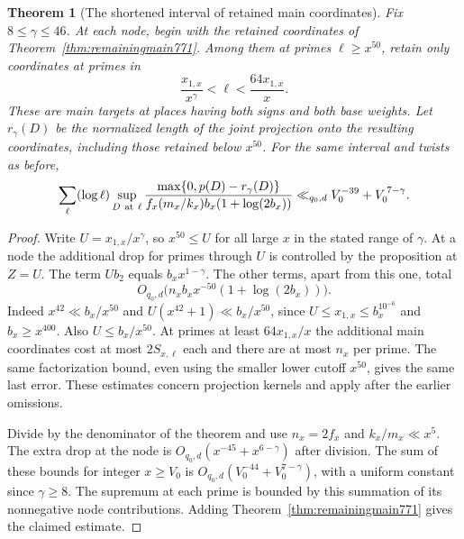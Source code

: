 \documentclass[a4paper,11pt]{article}
\newtheorem{theorem}[proposition]{Theorem}
\theoremstyle{definition}
\theoremstyle{remark}
\numberwithin{equation}{section}
\begin{document}
\begin{theorem}[The shortened interval of retained main coordinates]
\leavevmode\label{thm:middlerange773}
Fix \(8\le\gamma\le46\). At each node, begin with the
retained coordinates of Theorem~\ref{thm:remainingmain771}.
Among them at primes \(\ell\ge x^{50}\), retain only
coordinates at primes in
\[
                 \frac{x_{1,x}}{x^\gamma}<\ell<
                         \frac{64x_{1,x}}{x}.
\]
These are main targets at places having both signs and both
base weights. Let \(r_\gamma(D)\) be the normalized length
of the joint projection onto the resulting coordinates,
including those retained below \(x^{50}\). For the same
interval and twists as before,
\[
 \sum_{\ell}(\log\ell)\sup_{D\ {\rm at}\ \ell}
 \frac{\max\{0,p(D)-r_\gamma(D)\}}
      {f_x(m_x/k_x)b_x(1+\log(2b_x))}
 \ll_{q_0,d} V_0^{-39}+V_0^{\,7-\gamma}.
\]
\end{theorem}
\begin{proof}
Write \(U=x_{1,x}/x^\gamma\), so \(x^{50}\le U\) for all
large \(x\) in the stated range of \(\gamma\).
At a node the additional drop for primes through \(U\)
is controlled by the proposition at \(Z=U\). The
term \(U b_2\) equals \(b_x x^{1-\gamma}\). The other
terms, apart from this one, total
\[
        O_{q_0,d}\big(n_x b_x x^{-50}(1+\log(2b_x))\big).
\]
Indeed \(x^{42}\ll b_x/x^{50}\) and
\(U(x^{42}+1)\ll b_x/x^{50}\), since
\(U\le x_{1,x}\le b_x^{10^{-6}}\) and \(b_x\ge x^{400}\).
Also \(U\le b_x/x^{50}\). At primes at least
\(64x_{1,x}/x\) the additional main coordinates cost
at most \(2S_{x,\ell}\) each and there are at most \(n_x\)
per prime. The same factorization bound, even using the
smaller lower cutoff \(x^{50}\), gives the same last
error. These estimates concern projection kernels and
apply after the earlier omissions.

Divide by the denominator of the theorem and use
\(n_x=2f_x\) and \(k_x/m_x\ll x^5\).
The extra drop at the node is
\(O_{q_0,d}(x^{-45}+x^{6-\gamma})\) after division.
The sum of these bounds for integer \(x\ge V_0\) is
\(O_{q_0,d}(V_0^{-44}+V_0^{7-\gamma})\), with a uniform
constant since \(\gamma\ge8\). The supremum at each prime
is bounded by this summation of its nonnegative node
contributions. Adding Theorem~\ref{thm:remainingmain771}
gives the claimed estimate.
\end{proof}
\end{document}
